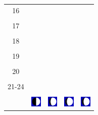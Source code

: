 \documentclass[a4paper,12pt, tikz]{scrartcl}
\begin{document}
\begin{tabularx}{\linewidth}{|c|X|X|p{2cm}|p{2cm}|}
            &   &       &    &   \\
          \hline
          16&   &                 &    &   \\
            &   &       &    &   \\
          \hline
          17&   &                 &    &   \\
            &   &       &    &   \\
          \hline
          18&   &                 &    &   \\
            &   &       &    &   \\
          \hline
          19&   &                 &     &   \\
            &   &       &    &   \\
          \hline
          20&   &              &    &   \\
            &   &       &    &   \\
          \hline 
          21-24&   &              &    &   \\
            &   &       &    &   \\
          \hline
                      & \vspace{0.01cm} \centerline{\includegraphics[width=0.5cm]{moon_phases/Moon_phase_2.svg.png}} \vspace{0.1cm} & \vspace{0.01cm} \centerline{\includegraphics[width=0.5cm]{moon_phases/Moon_phase_3.svg.png}} \vspace{0.1cm} & \vspace{0.01cm} \centerline{\includegraphics[width=0.5cm]{moon_phases/Moon_phase_3.svg.png}} \vspace{0.1cm} & \vspace{0.01cm} \centerline{\includegraphics[width=0.5cm]{moon_phases/Moon_phase_3.svg.png}} \vspace{0.1cm}\\
          \hline    
        \end{tabularx}
\end{document}
